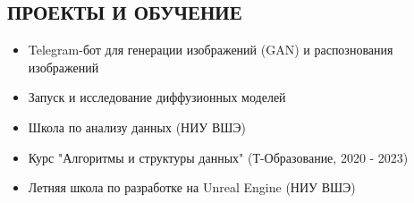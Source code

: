 \documentclass[margin]{res}
\begin{document}
\begin{resume}
{\color{royalblue} \section{ПРОЕКТЫ И ОБУЧЕНИЕ}}
\begin{itemize}[leftmargin=*,topsep=0pt,itemsep=0pt,parsep=0pt]
    \item Telegram-бот для генерации изображений (GAN) и распознования изображений
    \item Запуск и исследование диффузионных моделей
    \item Школа по анализу данных (НИУ ВШЭ)
    \item Курс "Алгоритмы и структуры данных" (Т-Образование, 2020 - 2023)
    \item Летняя школа по разработке на Unreal Engine (НИУ ВШЭ)
\end{itemize}

\end{resume}
\end{document}
